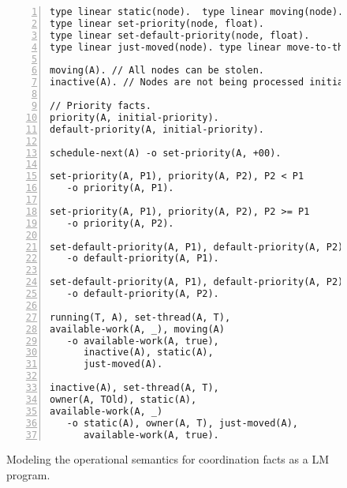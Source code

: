 \begin{figure}[h!]
\begin{Verbatim}[numbers=left,fontsize=\codesize,commandchars=*\#\&]
type linear static(node).  type linear moving(node).
type linear set-priority(node, float).
type linear set-default-priority(node, float).
type linear just-moved(node). type linear move-to-thread(node, thread).

moving(A). // All nodes can be stolen.
inactive(A). // Nodes are not being processed initially.

// Priority facts.
priority(A, initial-priority).
default-priority(A, initial-priority).

schedule-next(A) -o set-priority(A, +00).

set-priority(A, P1), priority(A, P2), P2 < P1
   -o priority(A, P1).

set-priority(A, P1), priority(A, P2), P2 >= P1
   -o priority(A, P2).

set-default-priority(A, P1), default-priority(A, P2), P2 < P1
   -o default-priority(A, P1).

set-default-priority(A, P1), default-priority(A, P2), P2 >= P1
   -o default-priority(A, P2).

running(T, A), set-thread(A, T),
available-work(A, _), moving(A)
   -o available-work(A, true),
      inactive(A), static(A),
      just-moved(A).

inactive(A), set-thread(A, T),
owner(A, TOld), static(A),
available-work(A, _)
   -o static(A), owner(A, T), just-moved(A),
      available-work(A, true).
\end{Verbatim}
\caption{Modeling the operational semantics for coordination facts as a LM program.}
\label{code:threads:modeling_scheduling}
\end{figure}
